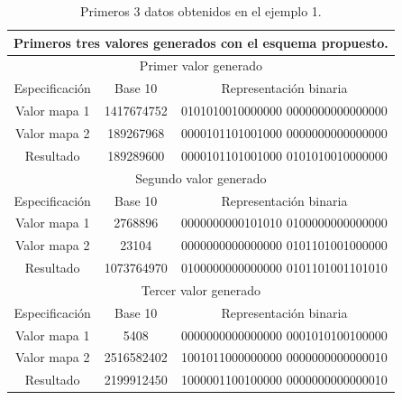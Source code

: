 \documentclass[10pt]{IEEEtran}
\begin{document}
\begin{table}[H]
\centering
\caption{Primeros 3 datos obtenidos en el ejemplo 1.}
\begin{tabular}[c]{|c|c|c|}
\hline

\multicolumn{3}{|c|}{Primeros tres valores generados con el esquema propuesto.}\\
\hline

\hline

\multicolumn{3}{|c|}{Primer valor generado }\\
\hline
Especificación  & Base 10 & Representación binaria \\
\hline
Valor mapa 1 &  1417674752  & 
0101010010000000  0000000000000000
 \\

\hline
Valor mapa 2 &  189267968  & 0000101101001000  0000000000000000 \\
\hline
Resultado  & 189289600 &  0000101101001000 0101010010000000 \\
\hline
\hline

\multicolumn{3}{|c|}{ Segundo valor generado }\\
\hline
Especificación  & Base 10 & Representación binaria \\
\hline
Valor mapa 1 &  2768896  & 0000000000101010 0100000000000000  \\

\hline
Valor mapa 2 &  23104  & 0000000000000000 0101101001000000 \\
\hline
Resultado  & 1073764970   &  0100000000000000 0101101001101010  \\
\hline
\hline

\multicolumn{3}{|c|}{Tercer valor generado }\\
\hline
Especificación  & Base 10  & Representación binaria \\
\hline
Valor mapa 1 &  5408  &  0000000000000000 0001010100100000  \\

\hline
Valor mapa 2 &  2516582402  &  1001011000000000 0000000000000010  \\
\hline
Resultado  &  2199912450  &  1000001100100000 0000000000000010 \\

\hline
\hline
\end{tabular}
\end{table}

 
\end{document}
